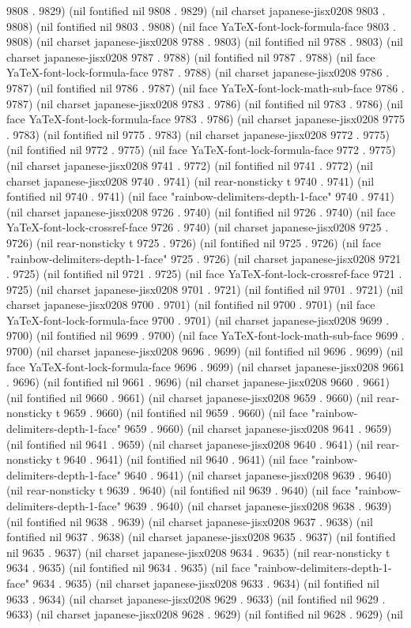 9808 . 9829) (nil fontified nil 9808 . 9829) (nil charset japanese-jisx0208 9803 . 9808) (nil fontified nil 9803 . 9808) (nil face YaTeX-font-lock-formula-face 9803 . 9808) (nil charset japanese-jisx0208 9788 . 9803) (nil fontified nil 9788 . 9803) (nil charset japanese-jisx0208 9787 . 9788) (nil fontified nil 9787 . 9788) (nil face YaTeX-font-lock-formula-face 9787 . 9788) (nil charset japanese-jisx0208 9786 . 9787) (nil fontified nil 9786 . 9787) (nil face YaTeX-font-lock-math-sub-face 9786 . 9787) (nil charset japanese-jisx0208 9783 . 9786) (nil fontified nil 9783 . 9786) (nil face YaTeX-font-lock-formula-face 9783 . 9786) (nil charset japanese-jisx0208 9775 . 9783) (nil fontified nil 9775 . 9783) (nil charset japanese-jisx0208 9772 . 9775) (nil fontified nil 9772 . 9775) (nil face YaTeX-font-lock-formula-face 9772 . 9775) (nil charset japanese-jisx0208 9741 . 9772) (nil fontified nil 9741 . 9772) (nil charset japanese-jisx0208 9740 . 9741) (nil rear-nonsticky t 9740 . 9741) (nil fontified nil 9740 . 9741) (nil face "rainbow-delimiters-depth-1-face" 9740 . 9741) (nil charset japanese-jisx0208 9726 . 9740) (nil fontified nil 9726 . 9740) (nil face YaTeX-font-lock-crossref-face 9726 . 9740) (nil charset japanese-jisx0208 9725 . 9726) (nil rear-nonsticky t 9725 . 9726) (nil fontified nil 9725 . 9726) (nil face "rainbow-delimiters-depth-1-face" 9725 . 9726) (nil charset japanese-jisx0208 9721 . 9725) (nil fontified nil 9721 . 9725) (nil face YaTeX-font-lock-crossref-face 9721 . 9725) (nil charset japanese-jisx0208 9701 . 9721) (nil fontified nil 9701 . 9721) (nil charset japanese-jisx0208 9700 . 9701) (nil fontified nil 9700 . 9701) (nil face YaTeX-font-lock-formula-face 9700 . 9701) (nil charset japanese-jisx0208 9699 . 9700) (nil fontified nil 9699 . 9700) (nil face YaTeX-font-lock-math-sub-face 9699 . 9700) (nil charset japanese-jisx0208 9696 . 9699) (nil fontified nil 9696 . 9699) (nil face YaTeX-font-lock-formula-face 9696 . 9699) (nil charset japanese-jisx0208 9661 . 9696) (nil fontified nil 9661 . 9696) (nil charset japanese-jisx0208 9660 . 9661) (nil fontified nil 9660 . 9661) (nil charset japanese-jisx0208 9659 . 9660) (nil rear-nonsticky t 9659 . 9660) (nil fontified nil 9659 . 9660) (nil face "rainbow-delimiters-depth-1-face" 9659 . 9660) (nil charset japanese-jisx0208 9641 . 9659) (nil fontified nil 9641 . 9659) (nil charset japanese-jisx0208 9640 . 9641) (nil rear-nonsticky t 9640 . 9641) (nil fontified nil 9640 . 9641) (nil face "rainbow-delimiters-depth-1-face" 9640 . 9641) (nil charset japanese-jisx0208 9639 . 9640) (nil rear-nonsticky t 9639 . 9640) (nil fontified nil 9639 . 9640) (nil face "rainbow-delimiters-depth-1-face" 9639 . 9640) (nil charset japanese-jisx0208 9638 . 9639) (nil fontified nil 9638 . 9639) (nil charset japanese-jisx0208 9637 . 9638) (nil fontified nil 9637 . 9638) (nil charset japanese-jisx0208 9635 . 9637) (nil fontified nil 9635 . 9637) (nil charset japanese-jisx0208 9634 . 9635) (nil rear-nonsticky t 9634 . 9635) (nil fontified nil 9634 . 9635) (nil face "rainbow-delimiters-depth-1-face" 9634 . 9635) (nil charset japanese-jisx0208 9633 . 9634) (nil fontified nil 9633 . 9634) (nil charset japanese-jisx0208 9629 . 9633) (nil fontified nil 9629 . 9633) (nil charset japanese-jisx0208 9628 . 9629) (nil fontified nil 9628 . 9629) (nil 